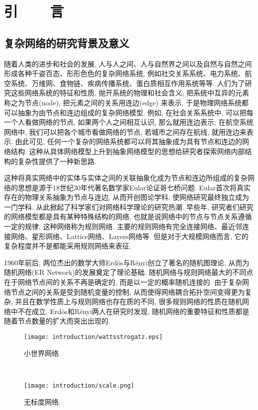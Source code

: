 \chapter{引~~~~言}\label{chap:introduction}


\section{复杂网络的研究背景及意义}

随着人类的进步和社会的发展, 人与人之间、人与自然界之间以及自然与自然之间形成各种千姿百态、形形色色的复杂网络系统, 例如社交关系系统、电力系统、航空系统、万维网、食物链、疾病传播系统、蛋白质相互作用系统等等. 人们为了研究这些网络系统的特征和性质, 抛开系统的物理和社会含义, 把系统中互异的元素称之为节点(node), 把元素之间的关系用连边(edge) 来表示, 于是物理网络系统都可以抽象为由节点和连边组成的复杂网络模型. 例如, 在社会关系系统中, 可以把每一个人看做网络的节点, 如果两个人之间相互认识, 那么就用连边表示; 在航空系统网络中, 我们可以把各个城市看做网络的节点, 若城市之间存在航线, 就用连边来表示. 由此可见, 任何一个复杂的网络系统都可以将其抽象成为具有节点和连边的网络结构. 这种从具体网络模型上升到抽象网络模型的思想给研究者探索网络内部结构的复杂性提供了一种新思路.

这种将真实网络中的实体与实体之间的关联抽象化成为节点和连边所组成的复杂网络的思想是源于$18$世纪$30$年代著名数学家Eular论证哥七桥问题. Eular首次将真实存在的物理关系抽象为节点与连边, 从而开创图论学科, 使网络研究最终独立成为一门学科. 从此掀起了科学家们对网络科学理论的研究热潮. 早些年, 研究者们研究的网络模型都是具有某种特殊结构的网络, 也就是说网络中的节点与节点关系遵循一定的规律, 这种网络称为规则网络. 主要的规则网络有完全连接网络、最近邻连接网络、星形网络、Lattice网络、Layers网络等. 但是对于大规模网络而言, 它的复杂程度并不是都能采用规则网络来表征.

1960年前后, 两位杰出的数学大师Erdös与Rényi创立了著名的随机图理论, 从而为随机网络(ER Network)的发展奠定了理论基础. 随机网络与规则网络最大的不同点在于网络节点间的关系不再是确定的, 而是以一定的概率随机连接的. 由于复杂网络节点之间的关系是受到随机变量的控制, 从而使得网络耦合拓扑空间变得更为复杂, 并且在数学性质上与规则网络也存在质的不同, 很多规则网络的性质在随机网络中不在成立. Erdös和Rényi两人在研究时发现, 随机网络的重要特征和性质都是随着节点数量的扩大而突出出现的.

\begin{figure}[htb]
\begin{minipage}[t]{0.48\linewidth}
\centering
\texttt{[image: introduction/wattsstrogatz.eps]}
\caption{小世界网络.}\label{smallworld}
\end{minipage}~~
\begin{minipage}[t]{0.48\linewidth}
\centering
\texttt{[image: introduction/scale.png]}
\caption{无标度网络.}\label{scalefree}
\end{minipage}
\end{figure}

